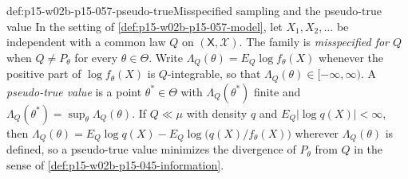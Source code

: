 \begin{hbdefinition}{def:p15-w02b-p15-057-pseudo-true}{Misspecified sampling and the pseudo-true value}
In the setting of \cref{def:p15-w02b-p15-057-model}, let
\(X_1,X_2,\ldots\) be independent with a common law \(Q\) on
\((\mathsf X,\mathscr X)\). The family is \emph{misspecified for \(Q\)}
when \(Q\neq P_\theta\) for every \(\theta\in\Theta\). Write
\(\Lambda_Q(\theta)=E_Q\log f_\theta(X)\) whenever the positive part of
\(\log f_\theta(X)\) is \(Q\)-integrable, so that
\(\Lambda_Q(\theta)\in[-\infty,\infty)\). A \emph{pseudo-true value} is a
point \(\theta^*\in\Theta\) with \(\Lambda_Q(\theta^*)\) finite and
\(\Lambda_Q(\theta^*)=\sup_\theta\Lambda_Q(\theta)\). If \(Q\ll\mu\) with
density \(q\) and \(E_Q|\log q(X)|<\infty\), then
\(\Lambda_Q(\theta)=E_Q\log q(X)-E_Q\log\bigl(q(X)/f_\theta(X)\bigr)\)
wherever \(\Lambda_Q(\theta)\) is defined, so a pseudo-true value minimizes
the divergence of \(P_\theta\) from \(Q\) in the sense of
\cref{def:p15-w02b-p15-045-information}.
\end{hbdefinition}

